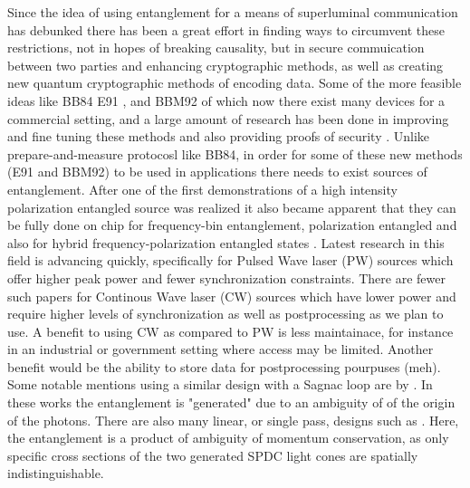 \documentclass{article}
\theoremstyle{mytheoremstyle}
\theoremstyle{mytheoremstyle}
\theoremstyle{myproblemstyle}
\begin{document}
Since the idea of using entanglement for a means of superluminal communication has debunked \cite{Dieks_1982} there has been a great effort
in finding ways to circumvent these restrictions, not in hopes of breaking causality, but in secure commuication between two parties and 
enhancing cryptographic methods, as well as creating new quantum cryptographic methods of encoding data.
Some of the more feasible ideas like BB84\cite{BB84} E91 \cite{E91}, and BBM92 \cite{Bennett_Brassard_Mermin_1992} of which now there exist many
devices for a commercial setting, and a large amount of research has been done in improving and fine tuning these methods and 
also providing proofs of security \cite{Rusca_Boaron_Curty_Martin_Zbinden_2018,Rusca_Boaron_Grünenfelder_Martin_Zbinden_2018}.
Unlike prepare-and-measure protocosl like BB84, in order for some of these new methods (E91 and BBM92) to be used in applications there needs to exist sources of entanglement.
After one of the first \cite{Kwiat_1995} demonstrations of a high intensity polarization entangled source was realized it also became
apparent that they can be fully done on chip \cite{S_G_S_C_F_B_L_G_B_2022} for frequency-bin entanglement, polarization entangled \cite{L_Z_F_F_L_L_W_R_D_X_etal._2017}
and also for hybrid frequency-polarization entangled states \cite{F_R_D_F_L_M_A_B_D_2023}.
Latest research in this field is advancing quickly, specifically for Pulsed Wave laser (PW) sources which offer higher peak
power and fewer synchronization constraints. There are fewer such papers for Continous Wave laser (CW) sources which have
lower power and require higher levels of synchronization as
well as postprocessing as we plan to use. A benefit to using CW as compared to PW is less maintainace, for instance in an industrial or government
setting where access may be limited. Another benefit would be the ability to store data for postprocessing pourpuses (meh).
Some notable mentions using a similar design with a Sagnac loop are by
\cite{Neumann_Buchner_Bulla_Bohmann_Ursin_2022_PW,Chen_Ecker_Wengerowsky_Bulla_Joshi_Steinlechner_Ursin_2018_CW}.
In these works the entanglement is "generated" due to an ambiguity of of the origin of the photons.
There are also many linear, or single pass, designs such as \cite{Lee_Kim_Cha_Moon_2016,Kwiat_Mattle_Weinfurter_Zeilinger_Sergienko_Shih_1995}.
Here, the entanglement is a product of ambiguity of momentum conservation, as only specific cross sections of the two generated SPDC light cones are spatially indistinguishable.
\end{document}
